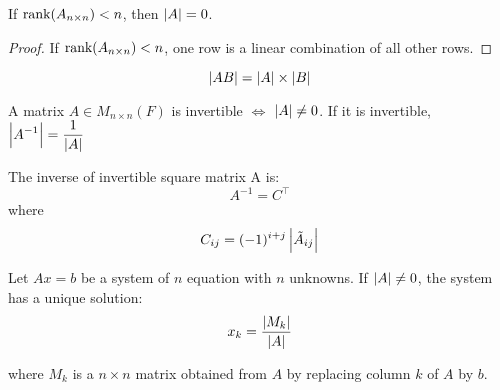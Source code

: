 \begin{theorem}
    If $\displaystyle \text{rank}( A_{n \times n} ) < n$, then $\displaystyle \left| \displaystyle A \right| = 0$.
\end{theorem}
\begin{proof}
    If $\displaystyle \text{rank}( A_{n \times n} ) < n$, one row is a linear combination of all other rows.
\end{proof}



\begin{theorem}
	\begin{equation}
		\displaystyle \left| \displaystyle AB \right| = \displaystyle \left| \displaystyle A \right| \times \displaystyle \left| \displaystyle B \right|
	\end{equation}
\end{theorem}

\begin{theorem}
	A matrix $A \in M_{n \times n}(F)$ is invertible $\Leftrightarrow$ $\displaystyle \left| \displaystyle A \right| \neq 0$. If it is invertible, $\displaystyle \left| \displaystyle A^{-1} \right| = \dfrac{1}{\displaystyle \left| \displaystyle A \right|}$
\end{theorem}



\begin{theorem}
    The inverse of invertible square matrix A is:
    \begin{equation*}
        A^{-1} = C^\top 
    \end{equation*}
    where 
    \begin{equation*}
        C_{ij} = (-1)^{i+j} \displaystyle \left| \displaystyle \tilde{A}_{ij} \right|
    \end{equation*}
\end{theorem}


\begin{theorem}
	Let $Ax=b$ be a system of $n$ equation with $n$ unknowns. If $\displaystyle \left| \displaystyle A \right| \neq 0$, the system has a unique solution:
	\begin{equation}
		x_k = \frac{\displaystyle \left| \displaystyle M_k \right|}{\displaystyle \left| \displaystyle A \right|}
	\end{equation}
	
	where $M_k$ is a $n\times n$ matrix obtained from $A$ by replacing column $k$ of $A$ by $b$.
\end{theorem}

